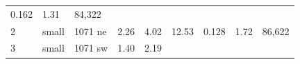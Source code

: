 \documentclass[
  10pt, ]{article}
\begin{document}
\begin{longtable}[]{@{}lllllllll@{}}
\begin{minipage}[t]{0.08\columnwidth}
0.162\strut
\end{minipage} & \begin{minipage}[t]{0.08\columnwidth}\raggedright
1.31\strut
\end{minipage} & \begin{minipage}[t]{0.08\columnwidth}\raggedright
84,322\strut
\end{minipage}\tabularnewline
\begin{minipage}[t]{0.08\columnwidth}\raggedright
2\strut
\end{minipage} & \begin{minipage}[t]{0.08\columnwidth}\raggedright
small\strut
\end{minipage} & \begin{minipage}[t]{0.08\columnwidth}\raggedright
1071 ne\strut
\end{minipage} & \begin{minipage}[t]{0.08\columnwidth}\raggedright
2.26\strut
\end{minipage} & \begin{minipage}[t]{0.08\columnwidth}\raggedright
4.02\strut
\end{minipage} & \begin{minipage}[t]{0.08\columnwidth}\raggedright
12.53\strut
\end{minipage} & \begin{minipage}[t]{0.08\columnwidth}\raggedright
0.128\strut
\end{minipage} & \begin{minipage}[t]{0.08\columnwidth}\raggedright
1.72\strut
\end{minipage} & \begin{minipage}[t]{0.08\columnwidth}\raggedright
86,622\strut
\end{minipage}\tabularnewline
\begin{minipage}[t]{0.08\columnwidth}\raggedright
3\strut
\end{minipage} & \begin{minipage}[t]{0.08\columnwidth}\raggedright
small\strut
\end{minipage} & \begin{minipage}[t]{0.08\columnwidth}\raggedright
1071 sw\strut
\end{minipage} & \begin{minipage}[t]{0.08\columnwidth}\raggedright
1.40\strut
\end{minipage} & \begin{minipage}[t]{0.08\columnwidth}\raggedright
2.19\strut
\end{minipage} & \begin{minipage}[t]{0.08\columnwidth}\raggedright

\end{minipage}
\end{longtable}
\end{document}
